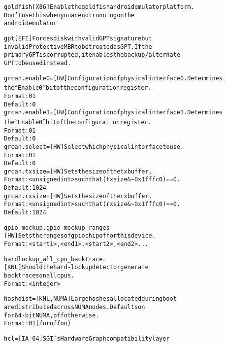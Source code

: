\documentclass[a4paper,8pt,english]{sphinxmanual}
\begin{document}
\begin{alltt}
        goldfish        {[}X86{]} Enable the goldfish android emulator platform.
                        Don't use this when you are not running on the
                        android emulator

        gpt             {[}EFI{]} Forces disk with valid GPT signature but
                        invalid Protective MBR to be treated as GPT. If the
                        primary GPT is corrupted, it enables the backup/alternate
                        GPT to be used instead.

        grcan.enable0=  {[}HW{]} Configuration of physical interface 0. Determines
                        the ``Enable 0'' bit of the configuration register.
                        Format: 0 \textbar{} 1
                        Default: 0
        grcan.enable1=  {[}HW{]} Configuration of physical interface 1. Determines
                        the ``Enable 0'' bit of the configuration register.
                        Format: 0 \textbar{} 1
                        Default: 0
        grcan.select=   {[}HW{]} Select which physical interface to use.
                        Format: 0 \textbar{} 1
                        Default: 0
        grcan.txsize=   {[}HW{]} Sets the size of the tx buffer.
                        Format: \textless{}unsigned int\textgreater{} such that (txsize \& \textasciitilde{}0x1fffc0) == 0.
                        Default: 1024
        grcan.rxsize=   {[}HW{]} Sets the size of the rx buffer.
                        Format: \textless{}unsigned int\textgreater{} such that (rxsize \& \textasciitilde{}0x1fffc0) == 0.
                        Default: 1024

        gpio-mockup.gpio\_mockup\_ranges
                        {[}HW{]} Sets the ranges of gpiochip of for this device.
                        Format: \textless{}start1\textgreater{},\textless{}end1\textgreater{},\textless{}start2\textgreater{},\textless{}end2\textgreater{}...

        hardlockup\_all\_cpu\_backtrace=
                        {[}KNL{]} Should the hard-lockup detector generate
                        backtraces on all cpus.
                        Format: \textless{}integer\textgreater{}

        hashdist=       {[}KNL,NUMA{]} Large hashes allocated during boot
                        are distributed across NUMA nodes.  Defaults on
                        for 64-bit NUMA, off otherwise.
                        Format: 0 \textbar{} 1 (for off \textbar{} on)

        hcl=            {[}IA-64{]} SGI's Hardware Graph compatibility layer


\end{alltt}
\end{document}
